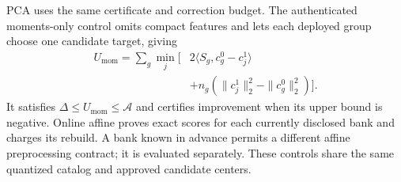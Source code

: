 PCA uses the same certificate and correction budget. The authenticated
moments-only control omits compact features and lets each deployed group
choose one candidate target, giving
\begin{equation}
 \begin{aligned}
 U_{\mathrm{mom}}=\sum_g\min_j\bigl[&2\langle S_g,c^0_g-c^1_j\rangle\\
 &+n_g(\|c^1_j\|_2^2-\|c^0_g\|_2^2)\bigr].
 \end{aligned}
 \label{eq:methodology-moments-baseline}
\end{equation}
It satisfies $\Delta\leq U_{\mathrm{mom}}\leq\mathcal A$ and certifies
improvement when its upper bound is negative. Online affine proves exact scores for each currently disclosed
bank and charges its rebuild. A bank known in advance permits a different
affine preprocessing contract; it is evaluated separately. These controls
share the same quantized catalog and approved candidate centers.
